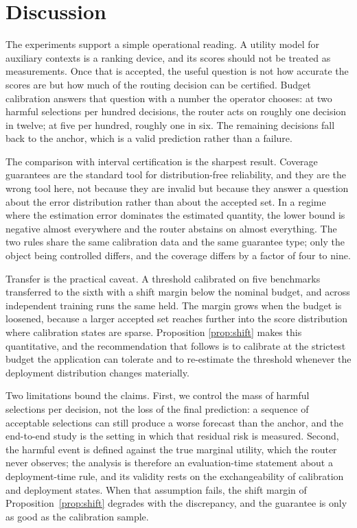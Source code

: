 \section{Discussion}

The experiments support a simple operational reading. A utility model for
auxiliary contexts is a ranking device, and its scores should not be treated
as measurements. Once that is accepted, the useful question is not how
accurate the scores are but how much of the routing decision can be certified.
Budget calibration answers that question with a number the operator chooses:
at two harmful selections per hundred decisions, the router acts on roughly
one decision in twelve; at five per hundred, roughly one in six. The remaining
decisions fall back to the anchor, which is a valid prediction rather than a
failure.

The comparison with interval certification is the sharpest result. Coverage
guarantees are the standard tool for distribution-free reliability, and they
are the wrong tool here, not because they are invalid but because they answer
a question about the error distribution rather than about the accepted set. In
a regime where the estimation error dominates the estimated quantity, the
lower bound is negative almost everywhere and the router abstains on almost
everything. The two rules share the same calibration data and the same
guarantee type; only the object being controlled differs, and the coverage
differs by a factor of four to nine.

Transfer is the practical caveat. A threshold calibrated on five benchmarks
transferred to the sixth with a shift margin below the nominal budget, and
across independent training runs the same held. The margin grows when the
budget is loosened, because a larger accepted set reaches further into the
score distribution where calibration states are sparse. Proposition
\ref{prop:shift} makes this quantitative, and the recommendation that follows
is to calibrate at the strictest budget the application can tolerate and to
re-estimate the threshold whenever the deployment distribution changes
materially.

Two limitations bound the claims. First, we control the mass of harmful
selections per decision, not the loss of the final prediction: a sequence of
acceptable selections can still produce a worse forecast than the anchor, and
the end-to-end study is the setting in which that residual risk is measured.
Second, the harmful event is defined against the true marginal utility, which
the router never observes; the analysis is therefore an evaluation-time
statement about a deployment-time rule, and its validity rests on the
exchangeability of calibration and deployment states. When that assumption
fails, the shift margin of Proposition~\ref{prop:shift} degrades with the
discrepancy, and the guarantee is only as good as the calibration sample.
